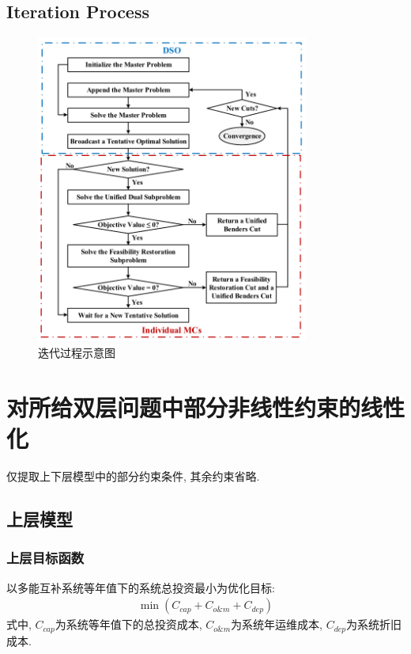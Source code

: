 \documentclass{article}
\begin{document}
\subsection{Iteration Process}
\begin{figure}[htbp]
    \centering
    \includegraphics[width=0.8\textwidth]{./pic/IterationProcess.png}
    \caption{迭代过程示意图}
    \label{fig:iteration_process}
\end{figure}


\clearpage
\setcounter{page}{1}
\setcounter{section}{0}

\section{对所给双层问题中部分非线性约束的线性化}
仅提取上下层模型中的部分约束条件, 其余约束省略.
\subsection{上层模型}
\subsubsection{上层目标函数}
以多能互补系统等年值下的系统总投资最小为优化目标:
\setcounter{equation}{0}
\begin{align}
    \min\left(C_{cap}+C_{o\&m}+C_{dep}\right)
\end{align}
式中, $C_{cap}$为系统等年值下的总投资成本, $C_{o\&m}$为系统年运维成本, $C_{dep}$为系统折旧成本.
\end{document}
